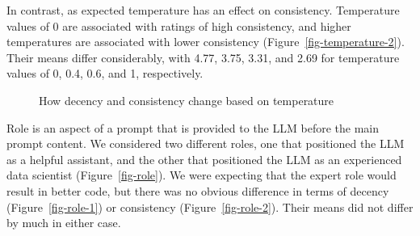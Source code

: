 \documentclass[
  letterpaper,
  DIV=11,
  numbers=noendperiod]{scrartcl}
\begin{document}
In contrast, as expected temperature has an effect on consistency.
Temperature values of 0 are associated with ratings of high consistency,
and higher temperatures are associated with lower consistency
(Figure~\ref{fig-temperature-2}). Their means differ considerably, with
4.77, 3.75, 3.31, and 2.69 for temperature values of 0, 0.4, 0.6, and 1,
respectively.

\begin{figure}

\begin{minipage}[t]{0.50\linewidth}

{\centering 


}

\end{minipage}%
%
\begin{minipage}[t]{0.50\linewidth}

{\centering 


}

\end{minipage}%

\caption{\label{fig-temperature}How decency and consistency change based
on temperature}

\end{figure}

Role is an aspect of a prompt that is provided to the LLM before the
main prompt content. We considered two different roles, one that
positioned the LLM as a helpful assistant, and the other that positioned
the LLM as an experienced data scientist (Figure~\ref{fig-role}). We
were expecting that the expert role would result in better code, but
there was no obvious difference in terms of decency
(Figure~\ref{fig-role-1}) or consistency (Figure~\ref{fig-role-2}).
Their means did not differ by much in either case.
\end{document}
